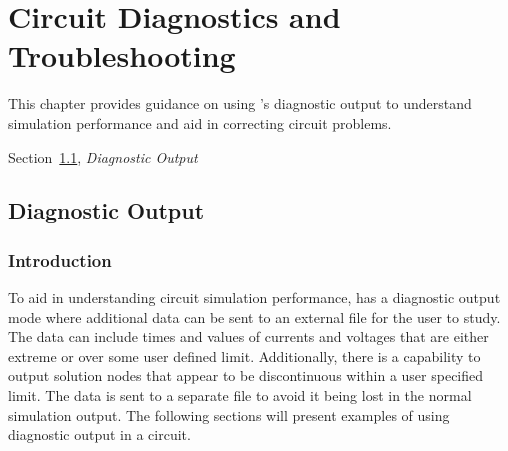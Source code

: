 

\chapter{Circuit Diagnostics and Troubleshooting}
\label{Parallel}

{
This chapter provides guidance on using \Xyce{}'s diagnostic output 
to understand simulation performance and aid in correcting
circuit problems.
\begin{XyceItemize}
\item Section~\ref{DiagnosticOutput}, {\em Diagnostic Output}
\end{XyceItemize}
}

\section{Diagnostic Output}
\label{DiagnosticOutput}

\subsection{Introduction}
To aid in understanding circuit simulation performance, \Xyce{} has a diagnostic output mode
where additional data can be sent to an external file for the user to study.  The data 
can include times and values of currents and voltages that are either extreme or over some
user defined limit.  Additionally, there is a capability to output solution nodes that 
appear to be discontinuous within a user specified limit.  The data is sent to a separate
file to avoid it being lost in the normal simulation output.  The following sections will
present examples of using diagnostic output in a circuit.


